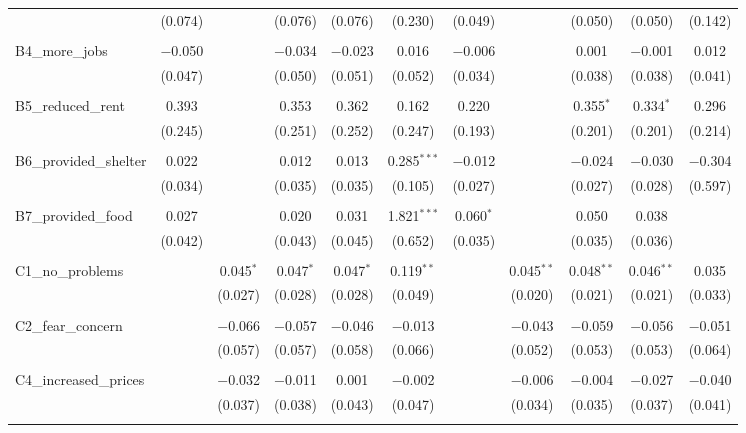 \begin{table}[H]
\begin{tabular}{@{\extracolsep{4pt}}lcccccccccc}
  & (0.074) &  & (0.076) & (0.076) & (0.230) & (0.049) &  & (0.050) & (0.050) & (0.142) \\ 
  & & & & & & & & & & \\ 
 B4\_more\_jobs & $-$0.050 &  & $-$0.034 & $-$0.023 & 0.016 & $-$0.006 &  & 0.001 & $-$0.001 & 0.012 \\ 
  & (0.047) &  & (0.050) & (0.051) & (0.052) & (0.034) &  & (0.038) & (0.038) & (0.041) \\ 
  & & & & & & & & & & \\ 
 B5\_reduced\_rent & 0.393 &  & 0.353 & 0.362 & 0.162 & 0.220 &  & 0.355$^{*}$ & 0.334$^{*}$ & 0.296 \\ 
  & (0.245) &  & (0.251) & (0.252) & (0.247) & (0.193) &  & (0.201) & (0.201) & (0.214) \\ 
  & & & & & & & & & & \\ 
 B6\_provided\_shelter & 0.022 &  & 0.012 & 0.013 & 0.285$^{***}$ & $-$0.012 &  & $-$0.024 & $-$0.030 & $-$0.304 \\ 
  & (0.034) &  & (0.035) & (0.035) & (0.105) & (0.027) &  & (0.027) & (0.028) & (0.597) \\ 
  & & & & & & & & & & \\ 
 B7\_provided\_food & 0.027 &  & 0.020 & 0.031 & 1.821$^{***}$ & 0.060$^{*}$ &  & 0.050 & 0.038 &  \\ 
  & (0.042) &  & (0.043) & (0.045) & (0.652) & (0.035) &  & (0.035) & (0.036) &  \\ 
  & & & & & & & & & & \\ 
 C1\_no\_problems &  & 0.045$^{*}$ & 0.047$^{*}$ & 0.047$^{*}$ & 0.119$^{**}$ &  & 0.045$^{**}$ & 0.048$^{**}$ & 0.046$^{**}$ & 0.035 \\ 
  &  & (0.027) & (0.028) & (0.028) & (0.049) &  & (0.020) & (0.021) & (0.021) & (0.033) \\ 
  & & & & & & & & & & \\ 
 C2\_fear\_concern &  & $-$0.066 & $-$0.057 & $-$0.046 & $-$0.013 &  & $-$0.043 & $-$0.059 & $-$0.056 & $-$0.051 \\ 
  &  & (0.057) & (0.057) & (0.058) & (0.066) &  & (0.052) & (0.053) & (0.053) & (0.064) \\ 
  & & & & & & & & & & \\ 
 C4\_increased\_prices &  & $-$0.032 & $-$0.011 & 0.001 & $-$0.002 &  & $-$0.006 & $-$0.004 & $-$0.027 & $-$0.040 \\ 
  &  & (0.037) & (0.038) & (0.043) & (0.047) &  & (0.034) & (0.035) & (0.037) & (0.041) \\ 
  & & & & & & & & & & \\ 

\end{tabular}
\end{table}
